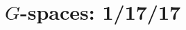 \documentclass{notes_d}
\begin{document}

\frontstuff

\section{$G$-spaces: 1/17/17}
	



{}

\end{document}
